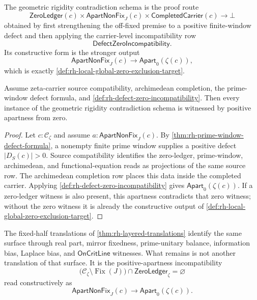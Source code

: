 \begin{definition}
\label{def:rh-geometric-rigidity-contradiction-schema}
The geometric rigidity contradiction schema is the proof route
$$
\mathsf{ZeroLedger}(c)
\times
\mathsf{ApartNonFix}_{J}(c)
\times
\mathsf{CompletedCarrier}(c)
\longrightarrow
\bot
$$
obtained by first strengthening the off-fixed premise to a positive
finite-window defect and then applying the carrier-level incompatibility
row
$$
\mathsf{DefectZeroIncompatibility}.
$$
Its constructive form is the stronger output
$$
\mathsf{ApartNonFix}_{J}(c)
\to
\mathsf{Apart}_{0}(\zeta(c)),
$$
which is exactly \autoref{def:rh-local-global-zero-exclusion-target}.
\end{definition}

\begin{theorem}
\label{thm:rh-rigidity-contradiction-constructive-apartness}
Assume zeta-carrier source compatibility, archimedean completion, the
prime-window defect formula, and
\autoref{def:rh-defect-zero-incompatibility}. Then every instance of the
geometric rigidity contradiction schema is witnessed by positive
apartness from zero.
\end{theorem}

\begin{proof}
Let $c:\mathcal C_{\zeta}$ and assume
$a:\mathsf{ApartNonFix}_{J}(c)$. By
\autoref{thm:rh-prime-window-defect-formula}, a nonempty finite prime
window supplies a positive defect $|D_S(c)|>0$. Source compatibility
identifies the zero-ledger, prime-window, archimedean, and
functional-equation reads as projections of the same source row. The
archimedean completion row places this data inside the completed carrier.
Applying \autoref{def:rh-defect-zero-incompatibility} gives
$\mathsf{Apart}_{0}(\zeta(c))$. If a zero-ledger witness is also present,
this apartness contradicts that zero witness; without the zero witness it
is already the constructive output of
\autoref{def:rh-local-global-zero-exclusion-target}.
\end{proof}

\begin{principle}
\label{prin:rh-geometric-content-local-global-zero-exclusion}
The fixed-half translations of \autoref{thm:rh-layered-translations}
identify the same surface through real part, mirror fixedness,
prime-unitary balance, information bias, Laplace bias, and
$\mathsf{OnCritLine}$ witnesses. What remains is not another translation
of that surface. It is the positive-apartness incompatibility
$$
\bigl(\mathcal C_{\zeta}\setminus\operatorname{Fix}(J)\bigr)
\cap
\mathsf{ZeroLedger}_{\zeta}
=
\varnothing
$$
read constructively as
$$
\mathsf{ApartNonFix}_{J}(c)
\to
\mathsf{Apart}_{0}(\zeta(c)).
$$
\end{principle}

